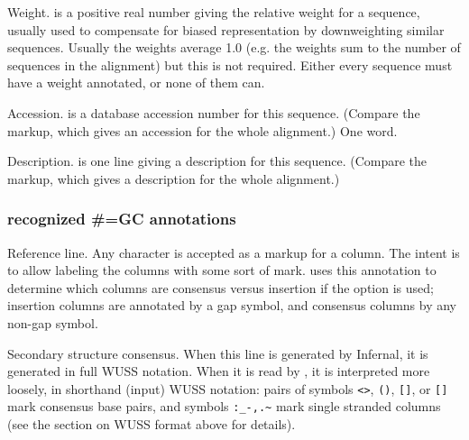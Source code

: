 \begin{sreitems}{}
\item [\emprog{WT  <f>}]
        Weight.  is a positive real number giving the
        relative weight for a sequence, usually used to compensate
        for biased representation by downweighting similar sequences.   
        Usually the weights average 1.0 (e.g. the weights sum to
        the number of sequences in the alignment) but this is not
        required. Either every sequence must have a weight annotated, 
        or none of them can.  

\item [\emprog{AC  <s>}]
        Accession.  is a database accession number for 
        this sequence. (Compare the  markup, which gives
        an accession for the whole alignment.) One word. 
        
\item [\emprog{DE  <s>}]
        Description.  is one line giving a description for
        this sequence. (Compare the  markup, which gives
        a description for the whole alignment.)
\end{sreitems}


\subsubsection{recognized \#=GC annotations}

\begin{sreitems}{}
\item [\emprog{RF}]
        Reference line. Any character is accepted as a markup for a
        column. The intent is to allow labeling the columns with some
        sort of mark.  uses this annotation to determine
        which columns are consensus versus insertion if the
         option is used; insertion columns are annotated
        by a gap symbol, and consensus columns by any non-gap symbol.
        
\item [\emprog{SS\_cons}]
	Secondary structure consensus.  When this line is generated by
        Infernal, it is generated in full WUSS notation.
        When it is read by , it is interpreted more
        loosely, in shorthand (input) WUSS notation: pairs of symbols
        \verb+<>+, \verb+()+, \verb+[]+, or \verb+[]+ mark consensus
        base pairs, and symbols \verb+:_-,.~+ mark single stranded
        columns (see the section on WUSS format above for details).

\end{sreitems}

